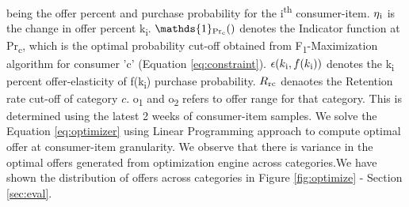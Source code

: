 being the offer percent and purchase probability for the i\textsuperscript{th} consumer-item.
$\eta\textsubscript{i}$ is the change in offer percent k\textsubscript{i}.
$ \mathds{1} \textsubscript{Pr\textsubscript{c}}()$ denotes the Indicator function 
at Pr\textsubscript{c}, which is the optimal probability cut-off obtained from F\textsubscript{1}-Maximization 
algorithm for consumer ’c’ (Equation \ref{eq:constraint}). $\epsilon(k\textsubscript{i},f(k\textsubscript{i}))$ 
denotes the k\textsubscript{i} percent offer-elasticity of f(k\textsubscript{i}) purchase probability.
$R\textsubscript{rc}$ denaotes the Retention rate cut-off of category $c$. o\textsubscript{1} and o\textsubscript{2} 
refers to offer range for that category. This is determined using the latest
2 weeks of consumer-item samples. We solve the Equation \ref{eq:optimizer} using Linear Programming approach
to compute optimal offer at consumer-item granularity. We observe that there is variance in the optimal 
offers generated from optimization engine across categories.We have shown the distribution of offers across
categories in Figure \ref{fig:optimize} - Section \ref{sec:eval}.

